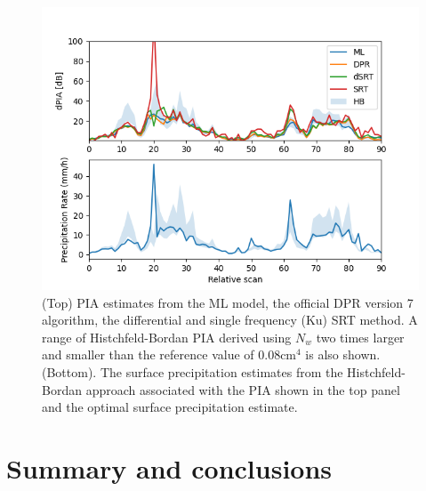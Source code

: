 \documentclass[10pt]{ietbook}
\begin{document}
\begin{figure}\label{fig:retrievals}
    \centerline{}
    \includegraphics[width=\textwidth]{retPIA.png}
    
    \caption{(Top) PIA estimates from the ML model, the official DPR version 7 algorithm, the differential and single frequency (Ku)
    SRT method.  A range of Histchfeld-Bordan PIA derived using $N_w$ two times larger and smaller than the reference value of 0.08cm$^4$ is also
    shown.(Bottom). The surface precipitation estimates from the Histchfeld-Bordan approach associated with the PIA shown in the top panel
    and the optimal surface precipitation estimate.}
\end{figure}

\section{Summary and conclusions}





 
\end{document}
